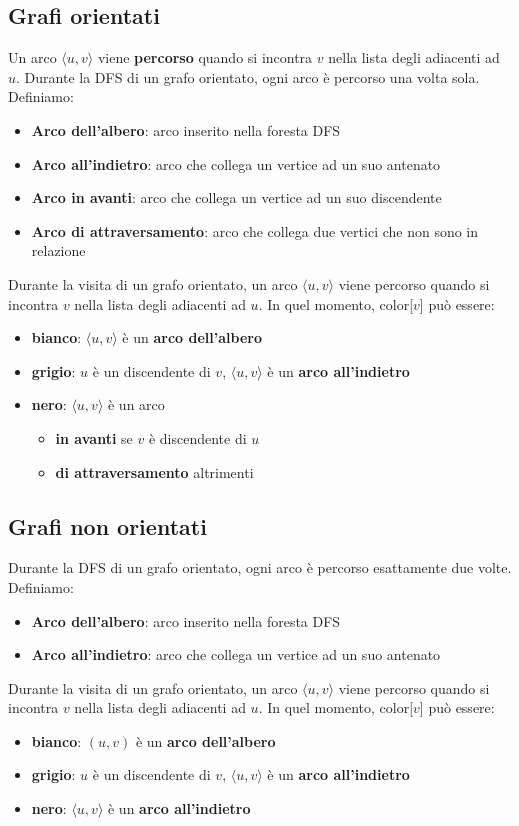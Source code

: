 \documentclass[11pt]{article}
\begin{document}
\subsection{Grafi orientati}
Un arco $\langle u,v \rangle$ viene \textbf{percorso} quando si incontra $v$ nella lista degli adiacenti ad $u$. Durante 
la DFS di un grafo orientato, ogni arco è percorso una volta sola. Definiamo:
\begin{itemize}
    \item \textbf{Arco dell'albero}: arco inserito nella foresta DFS
    \item \textbf{Arco all'indietro}: arco che collega un vertice ad un suo antenato
    \item \textbf{Arco in avanti}: arco che collega un vertice ad un suo discendente 
    \item \textbf{Arco di attraversamento}: arco che collega due vertici che non sono in relazione 
\end{itemize}
Durante la visita di un grafo orientato, un arco $\langle u,v \rangle$ viene percorso quando si incontra $v$ nella lista 
degli adiacenti ad $u$. In quel momento, color[$v$] può essere:
\begin{itemize}
    \item \textbf{bianco}: $\langle u,v \rangle$ è un \textbf{arco dell'albero}
    \item \textbf{grigio}: $u$ è un discendente di $v$, $\langle u,v \rangle$ è un \textbf{arco all'indietro} 
    \item \textbf{nero}: $\langle u,v \rangle$ è un arco
    \begin{itemize}
        \item \textbf{in avanti} se $v$ è discendente di $u$
        \item \textbf{di attraversamento} altrimenti
    \end{itemize}
\end{itemize}
\subsection{Grafi non orientati}
Durante la DFS di un grafo orientato, ogni arco è percorso esattamente due volte. Definiamo:
\begin{itemize}
    \item \textbf{Arco dell'albero}: arco inserito nella foresta DFS
    \item \textbf{Arco all'indietro}: arco che collega un vertice ad un suo antenato
\end{itemize}
Durante la visita di un grafo orientato, un arco $\langle u,v \rangle$ viene percorso quando si incontra $v$ nella lista 
degli adiacenti ad $u$. In quel momento, color[$v$] può essere:
\begin{itemize}
    \item \textbf{bianco}: $(u,v)$ è un \textbf{arco dell'albero}
    \item \textbf{grigio}: $u$ è un discendente di $v$, $\langle u,v \rangle$ è un \textbf{arco all'indietro} 
    \item \textbf{nero}: $\langle u,v \rangle$ è un \textbf{arco all'indietro}
\end{itemize}
\end{document}
